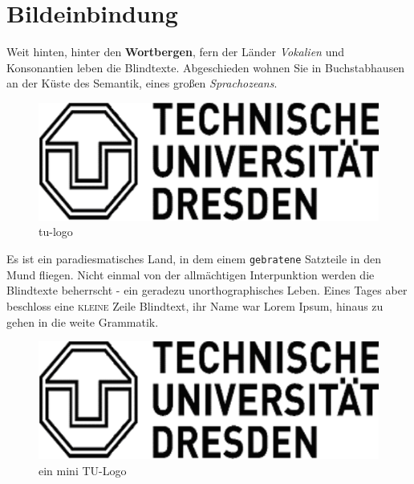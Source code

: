 \documentclass[%
	12pt,%
	a4paper,%
	oneside,%
	liststotoc, idxtotoc, bibtotoc, %
	parskip=half,%
	nochapterprefix,%
	appendixprefix, %
	headings=small,%
]{scrreprt}
\newcommand{\alt}[1]{}%
\begin{document}
\chapter{Bildeinbindung}
\label{sec:Bilder}

Weit hinten, hinter den \textbf{Wortbergen}, fern der Länder \textit{Vokalien} und Konsonantien leben die Blindtexte. Abgeschieden wohnen Sie in Buchstabhausen an der Küste%
 des Semantik, eines großen \textsl{Sprachozeans}. %

\begin{figure}[htbp] 
		\centering
		\alt{Ich bin das Logo der Technischen Universität Dresden}
		\includegraphics[scale=0.50]{images/tu_logo}%
	\caption{tu-logo}%
	\label{fig:tulogo}
\end{figure}

Es ist ein paradiesmatisches Land, in dem einem \texttt{gebratene} Satzteile in den Mund fliegen. Nicht einmal von der allmächtigen Interpunktion%
 werden die Blindtexte beherrscht - ein geradezu unorthographisches Leben. Eines Tages aber beschloss eine \textsc{kleine} Zeile Blindtext, ihr Name war Lorem Ipsum, hinaus zu gehen in die weite Grammatik.

\begin{figure}[htbp]
		\centering
		\alt{Ich bin das Logo der Technischen Universität Dresden}
		\includegraphics[scale=0.10]{images/tu_logo}%
	\caption[kurz]{ein mini TU-Logo}%
	\label{fig:minitulogo}
\end{figure}
\end{document}

